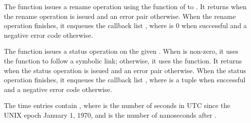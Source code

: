 The  function issues a rename operation using the
 function of  to . It
returns  when the rename operation is issued and an error
pair otherwise. When the rename operation finishes, it enqueues the
callback list , where 
is 0 when successful and a negative error code otherwise.

\begin{function}
\end{function}

The  function issues a status operation on the
given . When  is non-zero, it uses the
 function to follow a symbolic link; otherwise, it
uses the  function. It returns  when the
status operation is issued and an error pair otherwise. When the
status operation finishes, it enqueues the callback list
, where  is a
 tuple when successful and a negative error code
otherwise.

\begin{tuple}\end{tuple}\antipar
\begin{argtbl}
\end{argtbl}

The time entries contain , where
 is the number of seconds in UTC since the UNIX epoch January
1, 1970, and  is the number of nanoseconds after .

